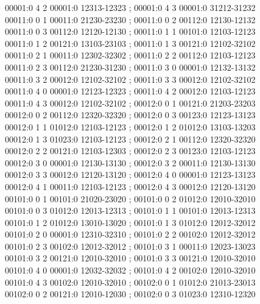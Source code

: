 \documentclass[11pt]{article}
\theoremstyle{remark}
\numberwithin{equation}{section}
\begin{document}
\begin{flushleft}
00001:0 4 2 00001:0 12313-12323 ; 00001:0 4 3 00001:0 31212-31232\\
00011:0 0 1 00011:0 21230-23230 ; 00011:0 0 2 00112:0 12130-12132\\
00011:0 0 3 00112:0 12120-12130 ; 00011:0 1 1 00101:0 12103-12123\\
00011:0 1 2 00121:0 13103-23103 ; 00011:0 1 3 00121:0 12102-32102\\
00011:0 2 1 00011:0 12302-32302 ; 00011:0 2 2 00112:0 12103-12123\\
00011:0 2 3 00112:0 21230-31230 ; 00011:0 3 0 00001:0 12132-13132\\
00011:0 3 2 00012:0 12102-32102 ; 00011:0 3 3 00012:0 12102-32102\\
00011:0 4 0 00001:0 12123-12323 ; 00011:0 4 2 00012:0 12103-12123\\
00011:0 4 3 00012:0 12102-32102 ; 00012:0 0 1 00121:0 21203-23203\\
00012:0 0 2 00112:0 12320-32320 ; 00012:0 0 3 00123:0 12123-13123\\
00012:0 1 1 01012:0 12103-12123 ; 00012:0 1 2 01012:0 13103-13203\\
00012:0 1 3 01023:0 12103-12123 ; 00012:0 2 1 00112:0 12320-32320\\
00012:0 2 2 00121:0 12103-12303 ; 00012:0 2 3 00123:0 12103-12123\\
00012:0 3 0 00001:0 12130-13130 ; 00012:0 3 2 00011:0 12130-13130\\
00012:0 3 3 00012:0 12120-13120 ; 00012:0 4 0 00001:0 12123-13123\\
00012:0 4 1 00011:0 12103-12123 ; 00012:0 4 3 00012:0 12120-13120\\
00101:0 0 1 00101:0 21020-23020 ; 00101:0 0 2 01012:0 12010-32010\\
00101:0 0 3 01012:0 12013-12313 ; 00101:0 1 1 00101:0 12013-12313\\
00101:0 1 2 01012:0 13010-13020 ; 00101:0 1 3 01012:0 12012-32012\\
00101:0 2 0 00001:0 12310-32310 ; 00101:0 2 2 00102:0 12012-32012\\
00101:0 2 3 00102:0 12012-32012 ; 00101:0 3 1 00011:0 12023-13023\\
00101:0 3 2 00121:0 12010-32010 ; 00101:0 3 3 00121:0 12010-32010\\
00101:0 4 0 00001:0 12032-32032 ; 00101:0 4 2 00102:0 12010-32010\\
00101:0 4 3 00102:0 12010-32010 ; 00102:0 0 1 01012:0 21013-23013\\
00102:0 0 2 00121:0 12010-12030 ; 00102:0 0 3 01023:0 12310-12320\\

\end{flushleft}
\end{document}
